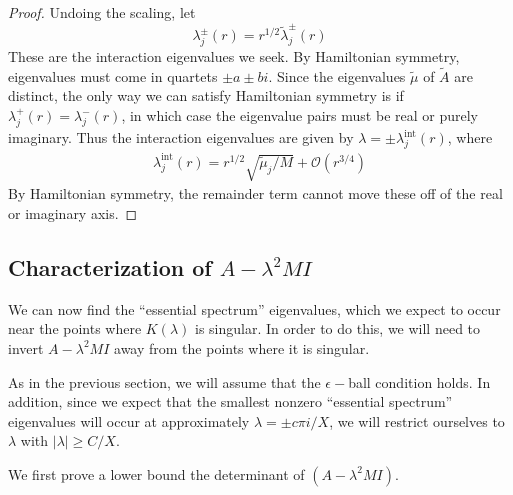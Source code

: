 \documentclass[thesis.tex]{subfiles}
\begin{document}
\begin{lemma}
\begin{proof}
Undoing the scaling, let
\[
\lambda_j^\pm(r) = r^{1/2} \tilde{\lambda}_j^\pm(r)
\]
These are the interaction eigenvalues we seek. By Hamiltonian symmetry, eigenvalues must come in quartets $\pm a \pm b i$. Since  the eigenvalues $\tilde{\mu}$ of $\tilde{A}$ are distinct, the only way we can satisfy Hamiltonian symmetry is if $\lambda_j^+(r) = \lambda_j^-(r)$, in which case the eigenvalue pairs must be real or purely imaginary. Thus the interaction eigenvalues are given by $\lambda = \pm \lambda^{\text{int}}_j(r)$, where
\begin{align*}
\lambda^{\text{int}}_j(r) = r^{1/2} \sqrt{\tilde{\mu}_j / M} + \mathcal{O}(r^{3/4})
\end{align*}
By Hamiltonian symmetry, the remainder term cannot move these off of the real or imaginary axis.
\end{proof}
\end{lemma}

\subsection{Characterization of \texorpdfstring{$A - \lambda^2 MI$}{Matrix A} }

We can now find the ``essential spectrum'' eigenvalues, which we expect to occur near the points where $K(\lambda)$ is singular. In order to do this, we will need to invert $A - \lambda^2 MI$ away from the points where it is singular.

As in the previous section, we will assume that the $\epsilon-$ball condition holds. In addition, since we expect that the smallest nonzero ``essential spectrum'' eigenvalues will occur at approximately $\lambda = \pm c \pi i / X$, we will restrict ourselves to $\lambda$ with $|\lambda| \geq C/X$.

We first prove a lower bound the determinant of $(A - \lambda^2 MI)$.
\end{document}
